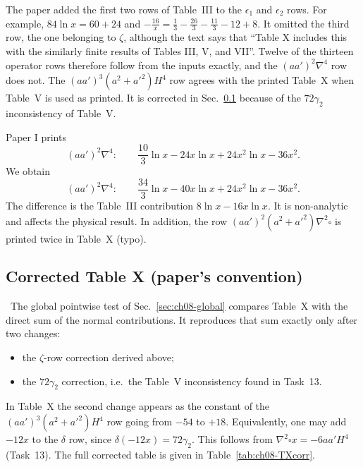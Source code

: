 The paper added the first two rows of Table~III to the $\epsilon_1$ and $\epsilon_2$ rows. For example, $84\ln x=60+24$ and $-\frac{16}x=\frac13-\frac{26}3-\frac{11}3-12+8$.
It omitted the third row, the one belonging to $\zeta$, although the text says that ``Table X includes this with the similarly finite results of Tables III, V, and VII''.
Twelve of the thirteen operator rows therefore follow from the inputs exactly, and the $(aa')^2\nabla^4$ row does not.
The $(aa')^3(a^2+a'^2)H^4$ row agrees with the printed Table~X when Table~V is used as printed. It is corrected in Sec.~\ref{sec:ch08-TXcorr} because of the $72\gamma_2$ inconsistency of Table~V.

\begin{discbox}
Paper I prints
\[
(aa')^2\nabla^4:\qquad \frac{10}{3}\ln x-24x\ln x+24x^2\ln x-36x^2 .
\]
We obtain
\[
(aa')^2\nabla^4:\qquad \frac{34}{3}\ln x-40x\ln x+24x^2\ln x-36x^2 .
\]
The difference is the Table~III contribution $8\ln x-16x\ln x$. It is non-analytic and affects the physical result.
In addition, the row $(aa')^2(a^2+a'^2)\nabla^2\square$ is printed twice in Table~X (typo).
\end{discbox}

\subsection{Corrected Table X (paper's convention)}
\label{sec:ch08-TXcorr}
\tD\tC\ The global pointwise test of Sec.~\ref{sec:ch08-global} compares Table~X with the direct sum of the normal contributions. It reproduces that sum exactly only after two changes:
\begin{itemize}[itemsep=0pt]
\item the $\zeta$-row correction derived above;
\item the $72\gamma_2$ correction, i.e.\ the Table~V inconsistency found in Task~13.
\end{itemize}
In Table~X the second change appears as the constant of the $(aa')^3(a^2+a'^2)H^4$ row going from $-54$ to $+18$.
Equivalently, one may add $-12x$ to the $\delta$ row, since $\delta(-12x)=72\gamma_2$.
This follows from $\nabla^2\square x=-6aa'H^4$ (Task~13). The full corrected table is given in Table~\ref{tab:ch08-TXcorr}.

